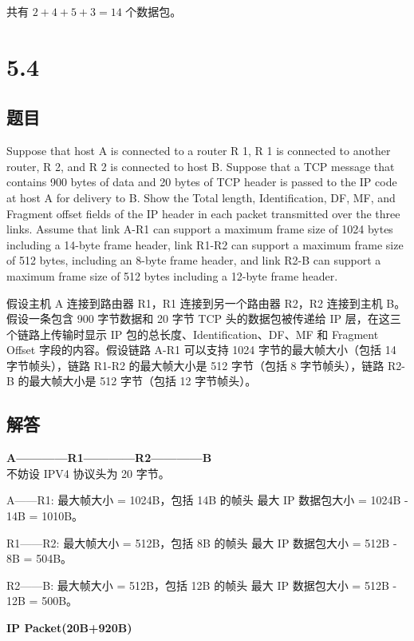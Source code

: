 共有 $ 2 + 4 + 5 + 3 = 14 $ 个数据包。

\section{5.4}

\subsection*{题目}
Suppose that host A is connected to a router R 1, R 1 is connected to another router, R 2, and R 2 is connected to host B. Suppose that a TCP message that contains 900 bytes of data and 20 bytes of TCP header is passed to the IP code at host A for delivery to B. Show the Total length, Identification, DF, MF, and Fragment offset fields of the IP header in each packet transmitted over the three links. Assume that link A-R1 can support a maximum frame size of 1024 bytes including a 14-byte frame header, link R1-R2 can support a maximum frame size of 512 bytes, including an 8-byte frame header, and link R2-B can support a maximum frame size of 512 bytes including a 12-byte frame header.

假设主机 A 连接到路由器 R1，R1 连接到另一个路由器 R2，R2 连接到主机 B。假设一条包含 900 字节数据和 20 字节 TCP 头的数据包被传递给 IP 层，在这三个链路上传输时显示 IP 包的总长度、Identification、DF、MF 和 Fragment Offset 字段的内容。假设链路 A-R1 可以支持 1024 字节的最大帧大小（包括 14 字节帧头），链路 R1-R2 的最大帧大小是 512 字节（包括 8 字节帧头），链路 R2-B 的最大帧大小是 512 字节（包括 12 字节帧头）。

\subsection*{解答}

\noindent \textbf{\large A————R1————R2————B} \\

不妨设 IPV4 协议头为 20 字节。

A——R1: 最大帧大小 = 1024B，包括 14B 的帧头
最大 IP 数据包大小 = 1024B - 14B = 1010B。

R1——R2: 最大帧大小 = 512B，包括 8B 的帧头
最大 IP 数据包大小 = 512B - 8B = 504B。

R2——B: 最大帧大小 = 512B，包括 12B 的帧头
最大 IP 数据包大小 = 512B - 12B = 500B。

\textbf{IP Packet(20B+920B)} \\[5pt]

\begin{center}
\end{center}

